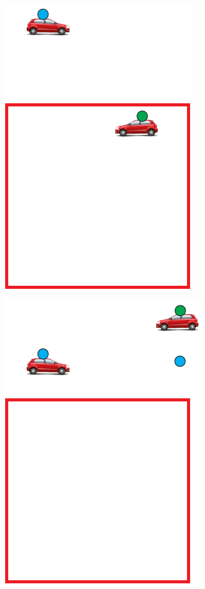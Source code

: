 \begin{figure}[htbp]
	\centering
	\begin{minipage}{0.33\textwidth}
		\centering
		\includegraphics[scale=0.5]{metodologia/figuras/veiculoSelecionadoDentroRA.pdf}
		\label{fig:veiculoSelecionadoDentroRA}
	\end{minipage}%
	\begin{minipage}{0.33\textwidth}
		\centering
		\includegraphics[scale=0.5]{metodologia/figuras/destinoVeiculoSelecionadoDentroRA.pdf}

\end{minipage}
\end{figure}
